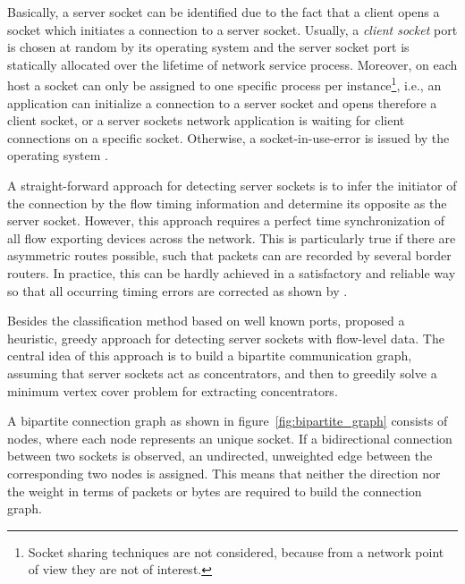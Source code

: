 Basically, a \gls{server socket} can be identified due to the fact that a client opens a socket which initiates a connection to a \gls{server socket}. Usually, a \emph{client socket} port is chosen at random by its operating system and the \gls{server socket} port is statically allocated over the lifetime of network service process. Moreover, on each host a socket can only be assigned to one specific process per instance\footnote{Socket sharing techniques are not considered, because from a network point of view they are not of interest.}, i.e., an application can initialize a connection to a server socket and opens therefore a client socket, or a \glspl{server socket} network application is waiting for client connections on a specific socket. Otherwise, a socket-in-use-error is issued by the operating system \citep{Schatzmann:Dissection}.

A straight-forward approach for detecting \glspl{server socket} is to infer the initiator of the connection by the flow timing information and determine its opposite as the \gls{server socket}. 
However, this approach requires a perfect time synchronization of all flow exporting devices across the network. This is particularly true if there are asymmetric routes possible, such that packets can are recorded by several border routers.
In practice, this can be hardly achieved in a satisfactory and reliable way so that all occurring timing errors are corrected as shown by \citet{Trammell}.

Besides the classification method based on well known ports, \citet{Schatzmann:Mining,Schatzmann:Dissection,Schatzmann:Tracing} proposed a heuristic, greedy approach for detecting \glspl{server socket} with flow-level data. The central idea of this approach is to build a bipartite communication graph, assuming that server sockets act as concentrators, and then to greedily solve a minimum vertex cover problem for extracting concentrators.

A bipartite connection graph as shown in figure \ref{fig:bipartite_graph}  consists of nodes, where each node represents an unique socket. If a bidirectional connection between two sockets is observed, an undirected, unweighted edge between the corresponding two nodes is assigned. This means that neither the direction nor the weight in terms of packets or bytes are required to build the connection graph.

